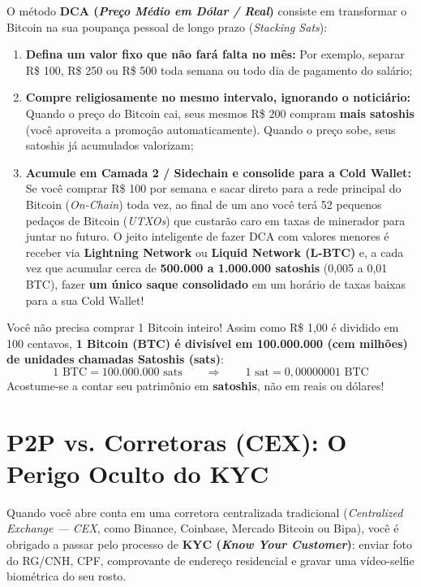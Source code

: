 \documentclass{pousadaguide}
\begin{document}
O método \textbf{DCA (\emph{Preço Médio em Dólar / Real})} consiste em transformar o Bitcoin na sua poupança pessoal de longo prazo (\emph{Stacking Sats}):
\begin{enumerate}
  \item \textbf{Defina um valor fixo que não fará falta no mês:} Por exemplo, separar R\$ 100, R\$ 250 ou R\$ 500 toda semana ou todo dia de pagamento do salário;
  \item \textbf{Compre religiosamente no mesmo intervalo, ignorando o noticiário:} Quando o preço do Bitcoin cai, seus mesmos R\$ 200 compram \textbf{mais satoshis} (você aproveita a promoção automaticamente). Quando o preço sobe, seus satoshis já acumulados valorizam;
  \item \textbf{Acumule em Camada 2 / Sidechain e consolide para a Cold Wallet:} Se você comprar R\$ 100 por semana e sacar direto para a rede principal do Bitcoin (\emph{On-Chain}) toda vez, ao final de um ano você terá 52 pequenos pedaços de Bitcoin (\emph{UTXOs}) que custarão caro em taxas de minerador para juntar no futuro. O jeito inteligente de fazer DCA com valores menores é receber via \textbf{Lightning Network} ou \textbf{Liquid Network (L-BTC)} e, a cada vez que acumular cerca de \textbf{500.000 a 1.000.000 satoshis} (0,005 a 0,01 BTC), fazer \textbf{um único saque consolidado} em um horário de taxas baixas para a sua Cold Wallet!
\end{enumerate}

\begin{nota}
Você não precisa comprar 1 Bitcoin inteiro! Assim como R\$ 1,00 é dividido em 100 centavos, \textbf{1 Bitcoin (BTC) é divisível em 100.000.000 (cem milhões) de unidades chamadas Satoshis (sats)}:
\[
1\text{ BTC} = 100.000.000\text{ sats} \qquad\Longrightarrow\qquad 1\text{ sat} = 0{,}00000001\text{ BTC}
\]
Acostume-se a contar seu patrimônio em \textbf{satoshis}, não em reais ou dólares!
\end{nota}

\section{P2P vs. Corretoras (CEX): O Perigo Oculto do KYC}

Quando você abre conta em uma corretora centralizada tradicional (\emph{Centralized Exchange — CEX}, como Binance, Coinbase, Mercado Bitcoin ou Bipa), você é obrigado a passar pelo processo de \textbf{KYC (\emph{Know Your Customer})}: enviar foto do RG/CNH, CPF, comprovante de endereço residencial e gravar uma vídeo-selfie biométrica do seu rosto.
\end{document}
